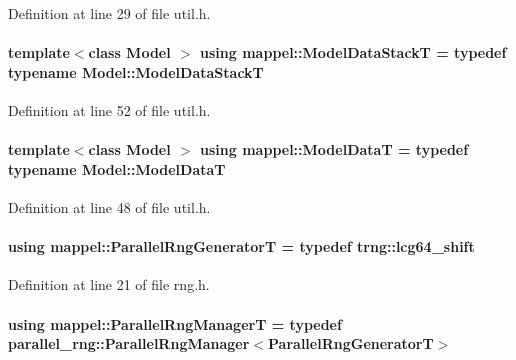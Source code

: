 Definition at line 29 of file util.\+h.

\paragraph[{\texorpdfstring{Model\+Data\+StackT}{ModelDataStackT}}]{\setlength{\rightskip}{0pt plus 5cm}template$<$class Model $>$ using {\bf mappel\+::\+Model\+Data\+StackT} = typedef typename Model\+::\+Model\+Data\+StackT}\hypertarget{namespacemappel_aaeb6665bc57476dd93c2df6ad8bc4768}{}\label{namespacemappel_aaeb6665bc57476dd93c2df6ad8bc4768}


Definition at line 52 of file util.\+h.

\paragraph[{\texorpdfstring{Model\+DataT}{ModelDataT}}]{\setlength{\rightskip}{0pt plus 5cm}template$<$class Model $>$ using {\bf mappel\+::\+Model\+DataT} = typedef typename Model\+::\+Model\+DataT}\hypertarget{namespacemappel_a97f050df953605381ae9c901c3b125f1}{}\label{namespacemappel_a97f050df953605381ae9c901c3b125f1}


Definition at line 48 of file util.\+h.

\paragraph[{\texorpdfstring{Parallel\+Rng\+GeneratorT}{ParallelRngGeneratorT}}]{\setlength{\rightskip}{0pt plus 5cm}using {\bf mappel\+::\+Parallel\+Rng\+GeneratorT} = typedef trng\+::lcg64\+\_\+shift}\hypertarget{namespacemappel_ad1e99b214465229065d30f881a89d1cc}{}\label{namespacemappel_ad1e99b214465229065d30f881a89d1cc}


Definition at line 21 of file rng.\+h.

\paragraph[{\texorpdfstring{Parallel\+Rng\+ManagerT}{ParallelRngManagerT}}]{\setlength{\rightskip}{0pt plus 5cm}using {\bf mappel\+::\+Parallel\+Rng\+ManagerT} = typedef parallel\+\_\+rng\+::\+Parallel\+Rng\+Manager$<${\bf Parallel\+Rng\+GeneratorT}$>$}\hypertarget{namespacemappel_acf276a4212f07b1ed4cb2ddce379ba1d}{}\label{namespacemappel_acf276a4212f07b1ed4cb2ddce379ba1d}


